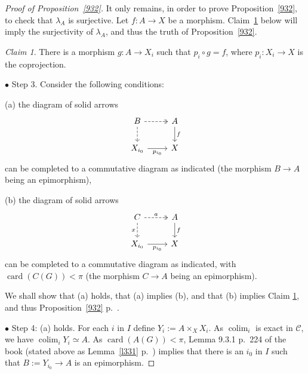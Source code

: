 \documentclass[12pt]{article}
\theoremstyle{remark}
\newtheorem{claim}[thm]{Claim}
\theoremstyle{definition}
\newcommand{\bu}{\bullet}
\newcommand{\nn}{\noindent}
\newcommand{\C}{\mathcal C}
\DeclareMathOperator*{\colim}{colim}
\DeclareMathOperator{\card}{card}
\begin{document}
\begin{proof}[Proof of Proposition~\ref{932}]
It only remains, in order to prove Proposition~\ref{932}, to check that $\lambda_A$ is surjective. Let $f:A\to X$ be a morphism. Claim~\ref{pig=f} below will imply the surjectivity of $\lambda_A$, and thus the truth of Proposition~\ref{932}. 

\begin{claim}\label{pig=f} 
There is a morphism $g:A\to X_i$ such that $p_i\circ g=f$, where $p_i:X_i\to X$ is the coprojection.
\end{claim} 

\nn$\bu$ Step 3. Consider the following conditions: 

\nn(a) the diagram of solid arrows 
$$
\begin{tikzcd}
B\ar[dashed,two heads]{r}\ar[dashed]{d}&A\ar{d}{f}\\ 
X_{i_0}\ar{r}[swap]{p_{i_0}}&X
\end{tikzcd}
$$
can be completed to a commutative diagram as indicated (the morphism $B\to A$ being an epimorphism),

\nn(b) the diagram of solid arrows 
%
\begin{equation}\label{fa}
\begin{tikzcd}
C\ar[dashed,two heads]{r}{a}\ar[dashed]{d}[swap]{x}&A\ar{d}{f}\\ 
X_{i_0}\ar{r}[swap]{p_{i_0}}&X
\end{tikzcd}
\end{equation}
%
can be completed to a commutative diagram as indicated, with $\card(C(G))<\pi$ (the morphism $C\to A$ being an epimorphism).

We shall show that (a) holds, that (a) implies (b), and that (b) implies Claim \ref{pig=f}, and thus Proposition~\ref{932} p.~\pageref{932}. 

\nn$\bu$ Step 4: (a) holds. For each $i$ in $I$ define $Y_i:=A\times_XX_i$. As $\colim_i$ is exact in $\C$, we have $\colim_iY_i\simeq A$. As $\card(A(G))<\pi$, Lemma 9.3.1 p.~224 of the book (stated above as Lemma~\ref{l331} p.~\pageref{l331}) implies that there is an $i_0$ in $I$ such that $B:=Y_{i_0}\to A$ is an epimorphism.


\end{proof}
\end{document}
